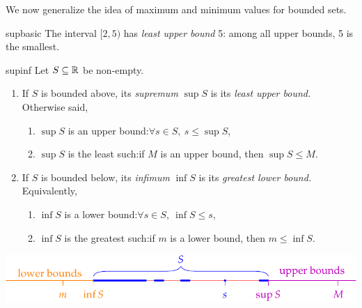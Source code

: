 
\goodbreak



We now generalize the idea of maximum and minimum values for bounded sets.

\begin{example}{}{supbasic}
	The interval $[2,5)$ has \emph{least upper bound} 5: among all upper bounds, 5 is the smallest.
\end{example} 

\begin{defn}{}{supinf}
	Let $S\subseteq\mathbb{R}$ be non-empty.
	\begin{enumerate}
	  \item If $S$ is bounded above, its \emph{supremum} $\sup S$ is its \emph{least upper bound.} Otherwise said,
		\begin{enumerate}
	  	\item $\sup S$ is an upper bound:\quad $\forall s\in S,\ s\le \sup S$,
	  	\item $\sup S$ is the least such:\quad if $M$ is an upper bound, then $\sup S\le M$.
		\end{enumerate}
		\item If $S$ is bounded below, its \emph{infimum} $\inf S$ is its \emph{greatest lower bound.} Equivalently,
		\begin{enumerate}
	  	\item $\inf S$ is a lower bound:\quad $\forall s\in S,\ \inf S\le s$,
	  	\item $\inf S$ is the greatest such:\quad if $m$ is a lower bound, then $m\le\inf S$.
		\end{enumerate}
	\end{enumerate}
	
	\begin{center}
		\vspace{-5pt}
		\includegraphics{supinf}
	\end{center}
\end{defn}


